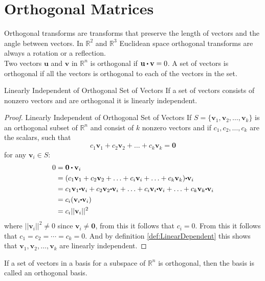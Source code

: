 
\section{Orthogonal Matrices}
Orthogonal transforms are transforms that preserve the length of vectors and the angle between vectors. In $\mathbb{R}^2$ and $\mathbb{R}^3$ Euclidean space orthogonal transforms are always a rotation or a reflection. \\
Two vectors $\textbf{u}$ and $\textbf{v}$ in $\mathbb{R}^n$ is orthogonal if $\textbf{u}\vprik \textbf{v}=0$. A set of vectors is orthogonal if all the vectors is orthogonal to each of the vectors in the set. 
\begin{theorem}{Linearly Independent of Orthogonal Set of Vectors}
If a set of vectors consists of nonzero vectors and are orthogonal it is linearly independent.\cite[375]{LiAl}
\end{theorem}

\begin{proof}{Linearly Independent of Orthogonal Set of Vectors}
If $S=\{\mathbf{v}_1, \mathbf{v}_2, \hdots, \mathbf{v}_k\}$ is an orthogonal subset of $\mathbb{R}^n$ and consist of $k$ nonzero vectors and if $c_1, c_2, \hdots, c_k$ are the scalars, such that
$$c_1\mathbf{v}_1 + c_2\mathbf{v}_2 + \hdots + c_k\mathbf{v}_k = \textbf{0}$$
for any $\mathbf{v}_i\in S$:
\begin{align*}
  0 &= \mathbf{0 \vprik v}_i  \\
  &= (c_1\mathbf{v}_1 + c_2\mathbf{v}_2 + \hdots + c_i \mathbf{v}_i + \hdots + c_k \mathbf{v}_k ) \mathbf{\vprik v}_i \\
  &= c_1\mathbf{v}_1 \mathbf{\vprik v}_i + c_2\mathbf{v}_2 \mathbf{\vprik v}_i + \hdots + c_i \mathbf{v}_i \mathbf{\vprik v}_i + \hdots + c_k\mathbf{v}_k \mathbf{\vprik v}_i \\
  &=c_i(\mathbf{v}_i \mathbf{\vprik v}_i)\\
  &=c_i||\mathbf{v}_i||^2
\end{align*}
where $||\mathbf{v}_i||^2 \neq 0$ since $\mathbf{v}_i \neq \mathbf{0}$, from this it follows that $c_i=0$. From this it follows that $c_1=c_2=\cdots=c_k=0$. And by definition \ref{def:LinearDependent} this shows that $\mathbf{v}_1, \mathbf{v}_2, \hdots, \mathbf{v}_k$ are linearly independent. \qedsymbol   
\end{proof}
If a set of vectors in a basis for a subspace of $\mathbb{R}^n$ is orthogonal, then the basis is called an orthogonal basis. 

